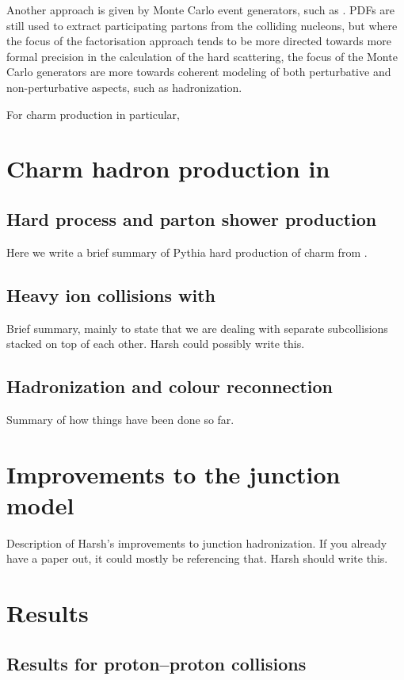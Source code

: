 \documentclass[main.tex]{subfiles}
\begin{document}
Another approach is given by Monte Carlo event generators, such as \pythia \cite{Bierlich:2022pfr}. PDFs are still used to extract 
participating partons from the colliding nucleons, but where the focus of the factorisation approach tends to be more directed towards
 more formal precision in the calculation of the hard scattering, the focus of the Monte Carlo generators are more towards coherent
  modeling of both perturbative and non-perturbative aspects, such as hadronization.

For charm production in particular, 


\section{Charm hadron production in \pythia}

\subsection{Hard process and parton shower production}
Here we write a brief summary of Pythia hard production of charm from \cite{Norrbin:1998bw}.

\subsection{Heavy ion collisions with \angantyr}
Brief summary, mainly to state that we are dealing with separate subcollisions stacked on top of each other. Harsh could possibly write this.

\subsection{Hadronization and colour reconnection}
Summary of how things have been done so far.

\section{Improvements to the junction model}
Description of Harsh's improvements to junction hadronization. If you already have a paper out, it could mostly be referencing that. 
Harsh should write this.

\section{Results}

\subsection{Results for proton--proton collisions}
\end{document}

